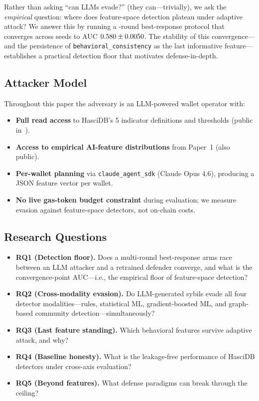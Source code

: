 \documentclass[sigconf,nonacm=false]{acmart}
\begin{document}
Rather than asking ``can LLMs evade?'' (they can---trivially), we ask the \emph{empirical} question: where does feature-space detection plateau under adaptive attack? We answer this by running a \bestResponseNRounds{}-round best-response protocol that converges across \bestResponseNSeeds{} seeds to AUC $0.580{} \pm 0.0050{}$. The stability of this convergence---and the persistence of \texttt{behavioral\_consistency} as the last informative feature---establishes a practical detection floor that motivates defense-in-depth.

\subsection{Attacker Model}

Throughout this paper the adversary is an LLM-powered wallet operator with:
\begin{itemize}
  \item \textbf{Full read access} to HasciDB's 5 indicator definitions and thresholds (public in~\cite{hascidb2026}).
  \item \textbf{Access to empirical AI-feature distributions} from Paper~1 (also public).
  \item \textbf{Per-wallet planning} via \texttt{claude\_agent\_sdk} (Claude Opus 4.6), producing a JSON feature vector per wallet.
  \item \textbf{No live gas-token budget constraint} during evaluation; we measure evasion against feature-space detectors, not on-chain costs.
\end{itemize}

\subsection{Research Questions}

\begin{itemize}
  \item \textbf{RQ1 (Detection floor).} Does a multi-round best-response arms race between an LLM attacker and a retrained defender converge, and what is the convergence-point AUC---i.e., the empirical floor of feature-space detection?
  \item \textbf{RQ2 (Cross-modality evasion).} Do LLM-generated sybils evade all four detector modalities---rules, statistical ML, gradient-boosted ML, and graph-based community detection---simultaneously?
  \item \textbf{RQ3 (Last feature standing).} Which behavioral features survive adaptive attack, and why?
  \item \textbf{RQ4 (Baseline honesty).} What is the leakage-free performance of HasciDB detectors under cross-axis evaluation?
  \item \textbf{RQ5 (Beyond features).} What defense paradigms can break through the \bestResponseAucFloorMean{} ceiling?
\end{itemize}
\end{document}
